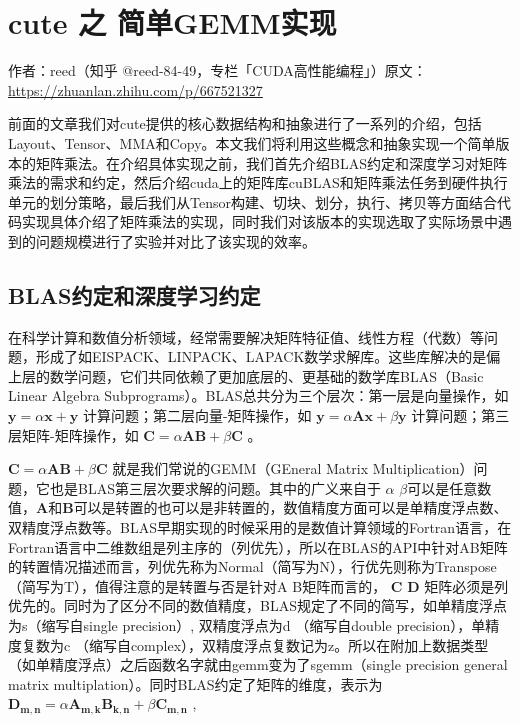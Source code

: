 \chapter{cute 之 简单GEMM实现}

\begin{center}\small 作者：reed（知乎 @reed-84-49，专栏「CUDA高性能编程」）\quad 原文：\url{https://zhuanlan.zhihu.com/p/667521327}\end{center}

前面的文章我们对cute提供的核心数据结构和抽象进行了一系列的介绍，包括Layout、Tensor、MMA和Copy。本文我们将利用这些概念和抽象实现一个简单版本的矩阵乘法。在介绍具体实现之前，我们首先介绍BLAS约定和深度学习对矩阵乘法的需求和约定，然后介绍cuda上的矩阵库cuBLAS和矩阵乘法任务到硬件执行单元的划分策略，最后我们从Tensor构建、切块、划分，执行、拷贝等方面结合代码实现具体介绍了矩阵乘法的实现，同时我们对该版本的实现选取了实际场景中遇到的问题规模进行了实验并对比了该实现的效率。

\section{BLAS约定和深度学习约定}

在科学计算和数值分析领域，经常需要解决矩阵特征值、线性方程（代数）等问题，形成了如EISPACK、LINPACK、LAPACK数学求解库。这些库解决的是偏上层的数学问题，它们共同依赖了更加底层的、更基础的数学库BLAS（Basic Linear Algebra Subprograms）。BLAS总共分为三个层次：第一层是向量操作，如 $\boldsymbol{y} = \alpha \boldsymbol{x} + \boldsymbol{y}$ 计算问题；第二层向量-矩阵操作，如 $\boldsymbol{y} = \alpha \boldsymbol{A} \boldsymbol{x} + \beta \boldsymbol{y}$ 计算问题；第三层矩阵-矩阵操作，如 $\boldsymbol{C} = \alpha \boldsymbol{A} \boldsymbol{B} + \beta \boldsymbol{C}$ 。

$\boldsymbol{C} = \alpha \boldsymbol{A} \boldsymbol{B} + \beta \boldsymbol{C}$ 就是我们常说的GEMM（GEneral Matrix Multiplication）问题，它也是BLAS第三层次要求解的问题。其中的广义来自于 $\alpha$ $\beta$可以是任意数值，$\boldsymbol{A}$和$\boldsymbol{B}$可以是转置的也可以是非转置的，数值精度方面可以是单精度浮点数、双精度浮点数等。BLAS早期实现的时候采用的是数值计算领域的Fortran语言，在Fortran语言中二维数组是列主序的（列优先），所以在BLAS的API中针对AB矩阵的转置情况描述而言，列优先称为Normal（简写为N），行优先则称为Transpose（简写为T），值得注意的是转置与否是针对A B矩阵而言的， $\boldsymbol{C}$ $\boldsymbol{D}$ 矩阵必须是列优先的。同时为了区分不同的数值精度，BLAS规定了不同的简写，如单精度浮点为s（缩写自single precision）, 双精度浮点为d （缩写自double precision），单精度复数为c （缩写自complex），双精度浮点复数记为z。所以在附加上数据类型（如单精度浮点）之后函数名字就由gemm变为了sgemm（single precision general matrix multiplation）。同时BLAS约定了矩阵的维度，表示为 $\boldsymbol{D_{m,n}} = \alpha \boldsymbol{A_{m, k}} \boldsymbol{B_{k, n}} + \beta \boldsymbol{C_{m,n}}$ ,

